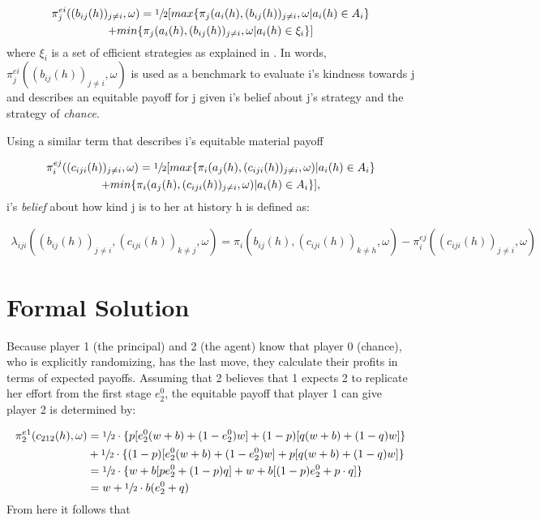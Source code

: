 \vspace{-10mm}
\begin{multline*}
	\pi^{ei}_j((b_{ij}(h))_{j \neq i}, \omega) = 
	\sfrac{1}{2} [max\{\pi_j(a_i(h), (b_{ij}(h))_{j \neq i}, \omega | a_i(h) \in A_i\}\\
	+ min \{\pi_j(a_i(h), (b_{ij}(h))_{j \neq i}, \omega | a_i(h) \in \xi_i\}]
\end{multline*}
where $\xi_i$ is a set of efficient strategies as explained in \cite{dufwenberg2004GEB}. In words, $\pi^{ei}_j((b_{ij}(h))_{j \neq i}, \omega)$ is used as a benchmark to evaluate i's kindness towards j and describes an equitable payoff for j given i's belief about j's strategy and the strategy of \emph{chance}. 

Using a similar term that describes i's equitable material payoff

\vspace{-10mm}
\begin{multline*}
	\pi^{ej}_i((c_{iji}(h))_{j \neq i}, \omega) = 
	\sfrac{1}{2} [max\{\pi_i(a_j(h), (c_{iji}(h))_{j \neq i}, \omega)| a_i(h) \in A_i\}\\
	+ min \{\pi_i(a_j(h), (c_{iji}(h))_{j \neq i}, \omega) | a_i(h) \in A_i\}],
\end{multline*}
i's \emph{belief} about how kind j is to her at history h is defined as:

\vspace{-10mm}
\begin{multline*}
	\lambda_{iji}((b_{ij}(h))_{j \neq i}, (c_{iji}(h))_{k \neq j}, \omega) =
	\pi_i(b_{ij}(h),(c_{iji}(h))_{k \neq h}, \omega)
	- \pi^{ej}_i((c_{iji}(h))_{j \neq i}, \omega) 
\end{multline*}




\section{Formal Solution}
Because player 1 (the principal) and 2 (the agent) know that player 0 (chance), who is explicitly randomizing, has the last move, they calculate their profits in terms of expected payoffs. Assuming that 2 believes that 1 expects 2 to replicate her effort from the first stage $e^0_2$, the equitable payoff that player 1 can give player 2 is  determined by:

\vspace{-10mm}\begin{align*}
	\pi^{e1}_2 (c_{212}(h), \omega ) & = \sfrac{1}{2} \cdot \{p[e^0_2(w+b)+(1-e^0_2)w]+(1-p)[q(w+b)+(1-q)w]\}\\
	& + \sfrac{1}{2} \cdot \{(1-p)[e^0_2(w+b)+(1-e^0_2)w]+p[q(w+b)+(1-q)w]\}\\
	& = \sfrac{1}{2} \cdot \{w+b[pe^0_2+(1-p)q] +w+b[(1-p)e^0_2+p\cdot q]\}\\
	& = w + \sfrac{1}{2} \cdot b(e^0_2+q)
\end{align*}
From here it follows that

